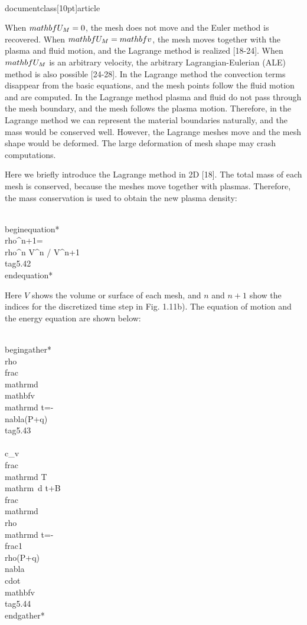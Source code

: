 \\documentclass[10pt]{article}
\begin{document}
{When $\\mathbf{U}_{M}=0$, the mesh does not move and the Euler method is recovered. When $\\mathbf{U}_{M}=\\mathbf{v}$, the mesh moves together with the plasma and fluid motion, and the Lagrange method is realized [18-24]. When $\\mathbf{U}_{M}$ is an arbitrary velocity, the arbitrary Lagrangian-Eulerian (ALE) method is also possible [24-28]. In the Lagrange method the convection terms disappear from the basic equations, and the mesh points follow the fluid motion and are computed. In the Lagrange method plasma and fluid do not pass through the mesh boundary, and the mesh follows the plasma motion. Therefore, in the Lagrange method we can represent the material boundaries naturally, and the mass would be conserved well. However, the Lagrange meshes move and the mesh shape would be deformed. The large deformation of mesh shape may crash computations.

Here we briefly introduce the Lagrange method in 2D [18]. The total mass of each mesh is conserved, because the meshes move together with plasmas. Therefore, the mass conservation is used to obtain the new plasma density:


\\begin{equation*}
\\rho^{n+1}=\\rho^{n} V^{n} / V^{n+1} \\tag{5.42}
\\end{equation*}


Here $V$ shows the volume or surface of each mesh, and $n$ and $n+1$ show the indices for the discretized time step in Fig. 1.11b). The equation of motion and the energy equation are shown below:


\\begin{gather*}
\\rho \\frac{\\mathrm{d} \\mathbf{v}}{\\mathrm{d} t}=-\\nabla(P+q)  \\tag{5.43}\\\\
c_{v} \\frac{\\mathrm{d} T}{\\mathrm{~d} t}+B \\frac{\\mathrm{d} \\rho}{\\mathrm{d} t}=-\\frac{1}{\\rho}(P+q) \\nabla \\cdot \\mathbf{v} \\tag{5.44}
\\end{gather*}


}
\end{document}
